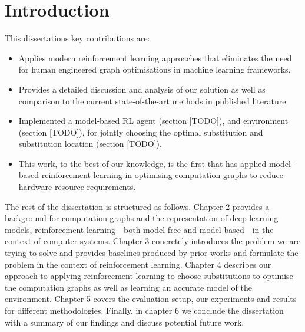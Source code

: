 \chapter{Introduction}

This dissertations key contributions are:

\begin{itemize}
  \item Applies modern reinforcement learning approaches that eliminates the need for human engineered graph optimisations in machine learning frameworks.
  \item Provides a detailed discussion and analysis of our solution as well as comparison to the current state-of-the-art methods in published literature.
  \item Implemented a model-based RL agent (section [TODO]), and environment (section [TODO]), for jointly choosing the optimal substitution and substitution location (section [TODO]).
  \item This work, to the best of our knowledge, is the first that has applied model-based reinforcement learning in optimising computation graphs to reduce hardware resource requirements.
\end{itemize}

The rest of the dissertation is structured as follows. Chapter 2 provides a background for computation graphs and the representation of deep learning models, reinforcement learning---both model-free and model-based---in the context of computer systems. Chapter 3 concretely introduces the problem we are trying to solve and provides baselines produced by prior works and formulate the problem in the context of reinforcement learning. Chapter 4 describes our approach to applying reinforcement learning to choose substitutions to optimise the computation graphs as well as learning an accurate model of the environment. Chapter 5 covers the evaluation setup, our experiments and results for different methodologies. Finally, in chapter 6 we conclude the dissertation with a summary of our findings and discuss potential future work.